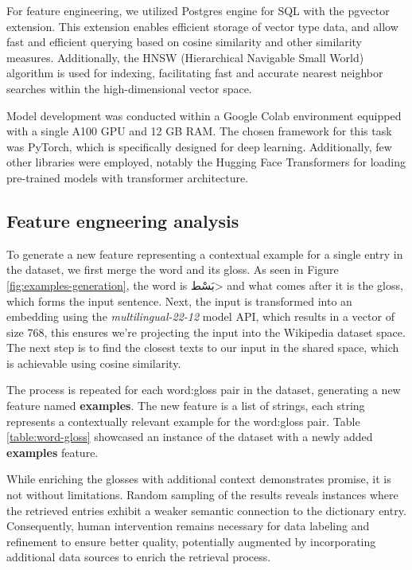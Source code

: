 \documentclass[12.5pt]{article}
\begin{document}
For feature engineering, we utilized Postgres engine for SQL with the pgvector extension. This extension enables efficient storage of vector type data, and allow fast and efficient querying based on cosine similarity and other similarity measures. Additionally, the HNSW (Hierarchical Navigable Small World) algorithm is used for indexing, facilitating fast and accurate nearest neighbor searches within the high-dimensional vector space.

Model development was conducted within a Google Colab environment equipped with a single A100 GPU and 12 GB RAM. The chosen framework for this task was PyTorch, which is specifically designed for deep learning. Additionally, few other libraries were employed, notably the Hugging Face Transformers for loading pre-trained models with transformer architecture.

\subsection{Feature engneering analysis}

To generate a new feature representing a contextual example for a single entry in the dataset, we first merge the word and its gloss. As seen in Figure \ref{fig:examples-generation}, the word is \<بَسْط> and what comes after it is the gloss, which forms the input sentence. Next, the input is transformed into an embedding using the \textit{multilingual-22-12} model API, which results in a vector of size 768, this ensures we’re projecting the input into the Wikipedia dataset space. The next step is to find the closest texts to our input in the shared space, which is achievable using cosine similarity.

The process is repeated for each word:gloss pair in the dataset, generating a new feature named \textbf{examples}. The new feature is a list of strings, each string represents a contextually relevant example for the word:gloss pair. Table \ref{table:word-gloss} showcased an instance of the dataset with a newly added \textbf{examples} feature.

While enriching the glosses with additional context demonstrates promise, it is not without limitations. Random sampling of the results reveals instances where the retrieved entries exhibit a weaker semantic connection to the dictionary entry. Consequently, human intervention remains necessary for data labeling and refinement to ensure better quality, potentially augmented by incorporating additional data sources to enrich the retrieval process.
\end{document}
